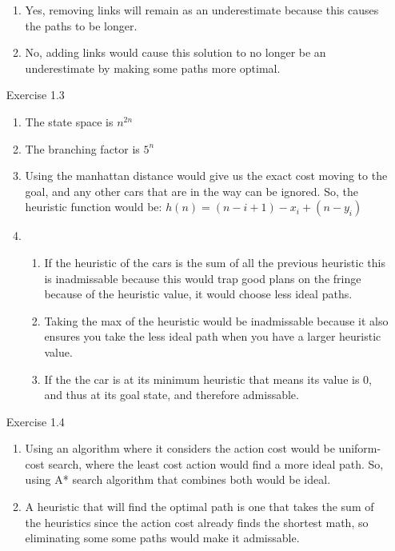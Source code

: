 \documentclass[letterpaper, 12pt]{article}
\begin{document}
\begin{enumerate}
\begin{enumerate}
        \item Yes, removing links will remain as an underestimate because this causes the paths to be longer.
        \item No, adding links would cause this solution to no longer be an underestimate by making some paths more optimal.
    \end{enumerate} 
    \item[Exercise 1.3] 
    \begin{enumerate}
        \item The state space is $n^{2n}$       
        \item The branching factor is $5^n$
        \item Using the manhattan distance would give us the exact cost moving to the goal, and any other cars that are in the way can be ignored. So, the heuristic function would be: $h(n)=(n-i+1)-x_i+(n-y_i)$
        \item 
        \begin{enumerate}
            \item If the heuristic of the cars is the sum of all the previous heuristic this is inadmissable because this would trap good plans on the fringe because of the heuristic value, it would choose less ideal paths.
            \item Taking the max of the heuristic would be inadmissable because it also ensures you take the less ideal path when you have a larger heuristic value.
            \item If the the car is at its minimum heuristic that means its value is 0, and thus at its goal state, and therefore admissable. 
        \end{enumerate}
    \end{enumerate} 
    \item[Exercise 1.4]
    \begin{enumerate}
        \item Using an algorithm where it considers the action cost would be uniform-cost search, where the least cost action would find a more ideal path. So, using A* search algorithm that combines both would be ideal.
        \item A heuristic that will find the optimal path is one that takes the sum of the heuristics since the action cost already finds the shortest math, so eliminating some some paths would make it admissable.          
    \end{enumerate}   
\end{enumerate}
\end{document}
